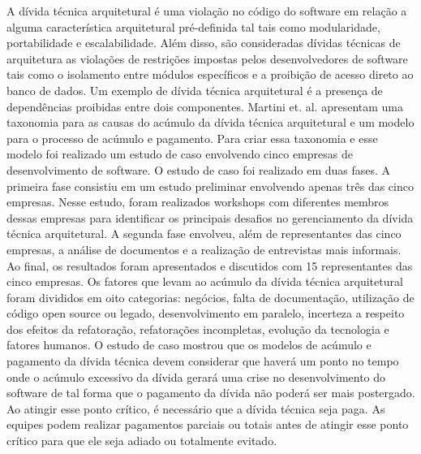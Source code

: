 A dívida técnica arquitetural é uma violação no código do software em relação a alguma característica arquitetural pré-definida tal tais como modularidade, portabilidade e escalabilidade. Além disso, são consideradas dívidas técnicas de arquitetura as violações de restrições impostas pelos desenvolvedores de software tais como o isolamento entre módulos específicos e  a proibição de acesso direto ao banco de dados.  Um exemplo de dívida técnica arquitetural é a presença de dependências proibidas entre  dois componentes. Martini et. al. \cite{martini2014architecture} apresentam uma taxonomia para as causas do acúmulo da dívida técnica arquitetural e um modelo para o processo de acúmulo e pagamento. Para criar essa taxonomia e esse modelo foi realizado um estudo de caso envolvendo cinco empresas de desenvolvimento de software.  O estudo de caso foi realizado em duas fases. A primeira fase consistiu em um estudo preliminar envolvendo apenas três das cinco empresas. Nesse estudo, foram realizados workshops com diferentes membros dessas empresas para identificar os principais desafios no gerenciamento da dívida técnica arquitetural. A segunda fase envolveu, além de representantes das cinco empresas, a análise de documentos e a realização de entrevistas mais informais. Ao final, os resultados foram apresentados e discutidos com 15 representantes das cinco empresas. Os fatores que levam ao acúmulo da dívida técnica arquitetural foram divididos em oito categorias: negócios, falta de documentação, utilização de código open source ou legado, desenvolvimento em paralelo, incerteza a respeito dos efeitos da refatoração, refatorações incompletas, evolução da tecnologia e fatores humanos. O estudo de caso mostrou que os modelos de acúmulo e pagamento da dívida técnica devem considerar que haverá um ponto no tempo onde o acúmulo excessivo da dívida gerará uma crise  no desenvolvimento do software de tal forma que o pagamento da dívida não poderá ser mais postergado. Ao atingir esse ponto crítico, é necessário que a dívida técnica seja paga. As equipes podem realizar pagamentos parciais ou totais antes de atingir esse ponto crítico para que ele seja adiado ou totalmente evitado. 





